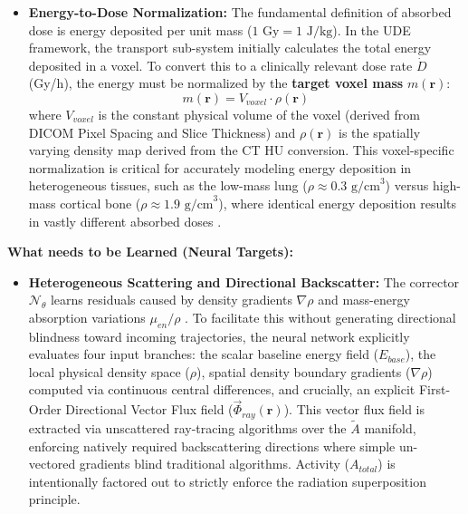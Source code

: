 \documentclass[11pt,a4paper]{article}
\begin{document}
\begin{itemize}
\begin{equation}
    \end{equation}
    This density map is essential for calculating the target mass $m(\mathbf{r})$ and serves as a primary spatial input for the neural corrector $\mathcal{N}_\theta$ \cite{GtzSchmidkonz2019, BaileyMarquis2022}.
    \item \textbf{Energy-to-Dose Normalization:} The fundamental definition of absorbed dose is energy deposited per unit mass ($1 \text{ Gy} = 1 \text{ J/kg}$). In the UDE framework, the transport sub-system initially calculates the total energy deposited in a voxel. To convert this to a clinically relevant dose rate $\dot{D}$ (Gy/h), the energy must be normalized by the \textbf{target voxel mass} $m(\mathbf{r})$:
    \begin{equation}
        m(\mathbf{r}) = V_{voxel} \cdot \rho(\mathbf{r})
    \end{equation}
    where $V_{voxel}$ is the constant physical volume of the voxel (derived from DICOM Pixel Spacing and Slice Thickness) and $\rho(\mathbf{r})$ is the spatially varying density map derived from the CT HU conversion. This voxel-specific normalization is critical for accurately modeling energy deposition in heterogeneous tissues, such as the low-mass lung ($ \rho \approx 0.3 \text{ g/cm}^3$) versus high-mass cortical bone ($\rho \approx 1.9 \text{ g/cm}^3$), where identical energy deposition results in vastly different absorbed doses \cite{GtzSchmidkonz2019, StabinMadsen2019}.
\end{itemize}

\textbf{What needs to be Learned (Neural Targets):}
\begin{itemize}
    \item \textbf{Heterogeneous Scattering and Directional Backscatter:} The corrector $\mathcal{N}_\theta$ learns residuals caused by density gradients $\nabla \rho$ and mass-energy absorption variations $\mu_{en}/\rho$ \cite{BaileyMarquis2022, MikellKappadath2016}. To facilitate this without generating directional blindness toward incoming trajectories, the neural network explicitly evaluates four input branches: the scalar baseline energy field ($E_{base}$), the local physical density space ($\rho$), spatial density boundary gradients ($\nabla \rho$) computed via continuous central differences, and crucially, an explicit First-Order Directional Vector Flux field ($\vec{\Phi}_{ray}(\mathbf{r})$). This vector flux field is extracted via unscattered ray-tracing algorithms over the $\tilde{A}$ manifold, enforcing natively required backscattering directions where simple un-vectored gradients blind traditional algorithms. Activity ($A_{total}$) is intentionally factored out to strictly enforce the radiation superposition principle.
\end{itemize}
\end{document}
